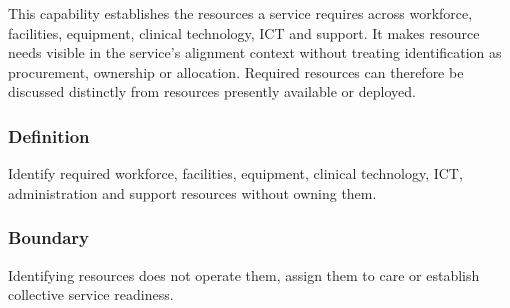 This capability establishes the resources a service requires across workforce, facilities, equipment, clinical technology, ICT and support. It makes resource needs visible in the service's alignment context without treating identification as procurement, ownership or allocation. Required resources can therefore be discussed distinctly from resources presently available or deployed.

\subsubsection*{Definition}

Identify required workforce, facilities, equipment, clinical technology, ICT, administration and support resources without owning them.

\subsubsection*{Boundary}

Identifying resources does not operate them, assign them to care or establish collective service readiness.

